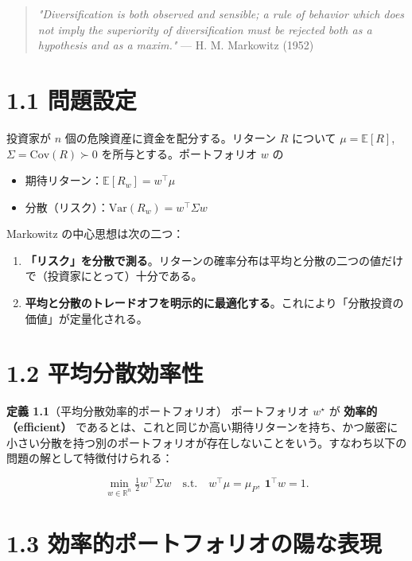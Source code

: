 \documentclass[11pt,a4paper]{report}
\begin{document}
\begin{quote}
\emph{"Diversification is both observed and sensible; a rule of behavior which does not imply the superiority of diversification must be rejected both as a hypothesis and as a maxim."}  — H. M. Markowitz (1952)
\end{quote}

\section{1.1 問題設定}

投資家が $n$ 個の危険資産に資金を配分する。リターン $R$ について $\mu = \mathbb{E}[R]$, $\Sigma = \mathrm{Cov}(R) \succ 0$ を所与とする。ポートフォリオ $w$ の

\begin{itemize}
\item 期待リターン：$\mathbb{E}[R_w] = w^\top \mu$
\item 分散（リスク）：$\mathrm{Var}(R_w) = w^\top \Sigma w$
\end{itemize}

Markowitz の中心思想は次の二つ：

\begin{enumerate}
\item \textbf{「リスク」を分散で測る}。リターンの確率分布は平均と分散の二つの値だけで（投資家にとって）十分である。
\item \textbf{平均と分散のトレードオフを明示的に最適化する}。これにより「分散投資の価値」が定量化される。
\end{enumerate}

\section{1.2 平均分散効率性}

\textbf{定義 1.1}（平均分散効率的ポートフォリオ） ポートフォリオ $w^\star$ が \textbf{効率的（efficient）} であるとは、これと同じか高い期待リターンを持ち、かつ厳密に小さい分散を持つ別のポートフォリオが存在しないことをいう。すなわち以下の問題の解として特徴付けられる：

\[ \min_{w \in \mathbb{R}^n} \tfrac{1}{2} w^\top \Sigma w \quad \text{s.t.}\quad w^\top \mu = \mu_P,\ \mathbf{1}^\top w = 1. \tag{P} \]

\section{1.3 効率的ポートフォリオの陽な表現}
\end{document}
